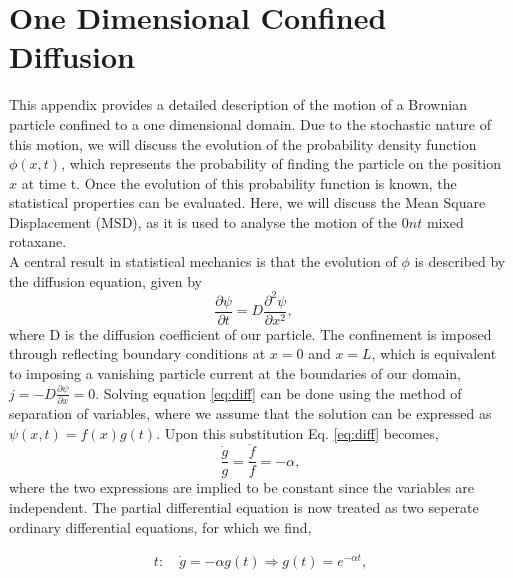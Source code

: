 \chapter{One Dimensional Confined Diffusion}

This appendix provides a detailed description of the motion of a Brownian particle
confined to a one dimensional domain. Due to the stochastic nature of this motion, we
will discuss the evolution of the probability density function $\phi(x,t)$, which
represents the probability of finding the particle on the position $x$ at time t.
Once the evolution of this probability function is known, the statistical properties can
be evaluated. Here, we will discuss the Mean Square Displacement (MSD), as it is used to
analyse the motion of the $0nt$ mixed rotaxane.\\
A central result in statistical mechanics is that the evolution of
$\phi$ is  described by the diffusion equation, given by
\begin{equation}
  \frac{\partial \psi}{\partial t} =  D \frac{\partial^2 \psi}{\partial x^2}, \quad
  \label{eq:diff}
\end{equation}
where D is the diffusion coefficient of our particle.
The confinement is imposed through reflecting boundary conditions at $x=0$ and $x=L$,
which is equivalent to imposing a
vanishing particle current at the boundaries of our domain, $j = - D \frac{\partial
\psi}{\partial x} = 0$. Solving equation \ref{eq:diff} can be done using the
method of
separation of variables, where we assume that the solution can be expressed as $
\psi(x,t) = f(x)g(t)$. Upon this substitution Eq. \ref{eq:diff} becomes,
\begin{equation}
  \frac{\dot{g}}{g} = \frac{\ddot{f}}{f} = - \alpha,
\end{equation}
where the two expressions are implied to be constant since the variables are independent.
The partial differential equation is now treated as two seperate ordinary differential
equations, for which we find,

\begin{align}
t:\quad \dot{g} = - \alpha g(t) \Rightarrow g(t) = e^{-\alpha t},
\end{align}

